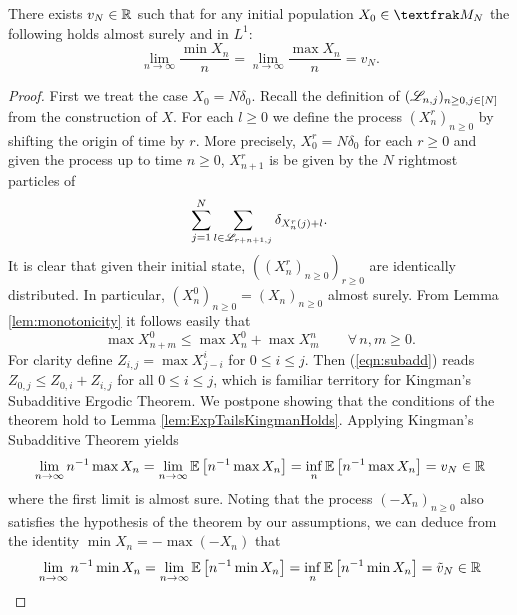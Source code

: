 \begin{proposition}\label{prop:ExpTailsSpeedExistence}
There exists $v_N \in \mathbb{R}$ such that for any initial population $X_0 \in \frak{M}_N$ the following holds almost surely and in $L^1$:
\begin{equation}\nonumber
\lim\limits_{n \to \infty} \frac{\min X_n}{n} = \lim\limits_{n \to \infty} \frac{\max X_n}{n} = v_N. 
\end{equation}
\end{proposition}

\begin{proof}
First we treat the case $X_0 = N \delta_0$. Recall the definition of $(\mathscr{L}_{n, j})_{n \geq 0, j \in [N]}$ from the construction of $X$. For each $l \geq 0$ we define the process $(X^r_n)_{n \geq 0}$ by shifting the origin of time by $r$. More precisely, $X^r_0 = N \delta_0$ for each $r \geq 0$ and given the process up to time $n \geq 0$, $X^r_{n+1}$ is be given by the $N$ rightmost particles of 
\begin{equation}\nonumber
\sum_{j = 1}^N \sum_{l \in \mathscr{L}_{r + n + 1, j}} \delta_{X^r_n(j) + l}. 
\end{equation}
It is clear that given their initial state, $((X^r_n)_{n \geq 0})_{r \geq 0}$ are identically distributed. In particular, $(X^0_n)_{n \geq 0} = (X_n)_{n \geq 0}$ almost surely. From Lemma \ref{lem:monotonicity} it follows easily that 
\begin{equation}\label{eqn:subadd}
\max X^0_{n + m} \leq \max X^0_n + \max X^n_m \qquad \forall\, n,m \geq 0. 
\end{equation}
For clarity define $Z_{i,j} = \max X^i_{j - i}$ for $0 \leq i \leq j$. Then (\ref{eqn:subadd}) reads $Z_{0, j} \leq Z_{0,i} + Z_{i,j}$ for all $0 \leq i \leq j$, which is familiar territory for Kingman's Subadditive Ergodic Theorem. We postpone showing that the conditions of the theorem hold to Lemma \ref{lem:ExpTailsKingmanHolds}. Applying Kingman's Subadditive Theorem yields 
\begin{equation}\nonumber
\lim_{n \to \infty} n^{-1} \max X_n = \lim_{n \to \infty} \mathbb{E}\left[ n^{-1} \max X_n \right] = \inf_n \mathbb{E}\left[ n^{-1} \max X_n \right] = v_N \in \mathbb{R}
\end{equation}
where the first limit is almost sure. Noting that the process $(-X_n)_{n \geq 0}$ also satisfies the hypothesis of the theorem by our assumptions, we can deduce from the identity $\min X_n = - \max (-X_n)$ that 
\begin{equation}\nonumber
\lim_{n \to \infty} n^{-1} \min X_n = \lim_{n \to \infty} \Ex{n^{-1} \min X_n} = \inf_n \Ex{n^{-1} \min X_n} = \tilde{v}_N \in \R

\end{equation}
\end{proof}
